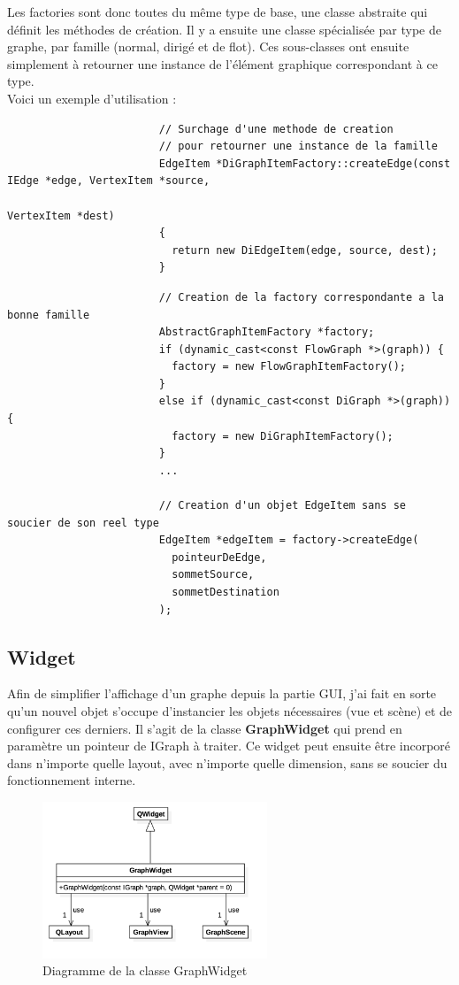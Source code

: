 \documentclass[french]{article}
\begin{document}
			Les factories sont donc toutes du même type de base, une classe abstraite qui définit les méthodes de création. Il y a ensuite une classe spécialisée par type de graphe, par famille (normal, dirigé et de flot). Ces sous-classes ont ensuite simplement à retourner une instance de l'élément graphique correspondant à ce type. \\
			
			Voici un exemple d'utilisation :
		
			\begin{lstlisting}
						// Surchage d'une methode de creation
						// pour retourner une instance de la famille
						EdgeItem *DiGraphItemFactory::createEdge(const IEdge *edge, VertexItem *source,
																 VertexItem *dest)
						{
						  return new DiEdgeItem(edge, source, dest);
						}
			\end{lstlisting}
			
			\begin{lstlisting}
						// Creation de la factory correspondante a la bonne famille
						AbstractGraphItemFactory *factory;
						if (dynamic_cast<const FlowGraph *>(graph)) {
						  factory = new FlowGraphItemFactory();
						}
						else if (dynamic_cast<const DiGraph *>(graph)) {
						  factory = new DiGraphItemFactory();
						}
						...
						
						// Creation d'un objet EdgeItem sans se soucier de son reel type
						EdgeItem *edgeItem = factory->createEdge(
						  pointeurDeEdge,
						  sommetSource,
						  sommetDestination
						);

			\end{lstlisting}
		
		\pagebreak
		
		\subsection{Widget}
			Afin de simplifier l'affichage d'un graphe depuis la partie GUI, j'ai fait en sorte qu'un nouvel objet s'occupe d'instancier les objets nécessaires (vue et scène) et de configurer ces derniers. Il s'agit de la classe \textbf{GraphWidget} qui prend en paramètre un pointeur de IGraph à traiter. Ce widget peut ensuite être incorporé dans n'importe quelle layout, avec n'importe quelle dimension, sans se soucier du fonctionnement interne.
			
			\begin{figure}[H]
				\centering
				\includegraphics[width=0.6\textwidth]{Conception/visualization/graphwidget.png}
				\caption{Diagramme de la classe GraphWidget}
			\end{figure}
			
\end{document}
